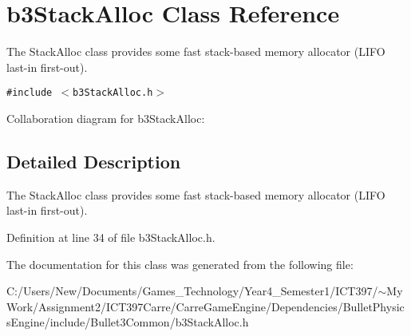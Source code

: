 \hypertarget{classb3_stack_alloc}{
\section{b3StackAlloc Class Reference}
\label{classb3_stack_alloc}
}
The StackAlloc class provides some fast stack-based memory allocator (LIFO last-in first-out).  


{\tt \#include $<$b3StackAlloc.h$>$}

Collaboration diagram for b3StackAlloc:

\subsection{Detailed Description}
The StackAlloc class provides some fast stack-based memory allocator (LIFO last-in first-out). 

Definition at line 34 of file b3StackAlloc.h.

The documentation for this class was generated from the following file:\begin{CompactItemize}
\item 
C:/Users/New/Documents/Games\_\-Technology/Year4\_\-Semester1/ICT397/$\sim$My Work/Assignment2/ICT397Carre/CarreGameEngine/Dependencies/BulletPhysicsEngine/include/Bullet3Common/b3StackAlloc.h\end{CompactItemize}
